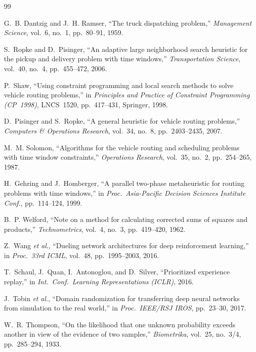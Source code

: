 \documentclass[conference]{IEEEtran}
\begin{document}
\begin{thebibliography}{99}

G.~B. Dantzig and J.~H. Ramser,
``The truck dispatching problem,''
\textit{Management Science}, vol.~6, no.~1, pp.~80--91, 1959.

S.~Ropke and D.~Pisinger,
``An adaptive large neighborhood search heuristic for the pickup and delivery
  problem with time windows,''
\textit{Transportation Science}, vol.~40, no.~4, pp.~455--472, 2006.

P.~Shaw,
``Using constraint programming and local search methods to solve vehicle routing
  problems,''
in \textit{Principles and Practice of Constraint Programming (CP~1998)},
LNCS~1520, pp.~417--431, Springer, 1998.

D.~Pisinger and S.~Ropke,
``A general heuristic for vehicle routing problems,''
\textit{Computers \& Operations Research}, vol.~34, no.~8,
pp.~2403--2435, 2007.

M.~M. Solomon,
``Algorithms for the vehicle routing and scheduling problems with time window
  constraints,''
\textit{Operations Research}, vol.~35, no.~2, pp.~254--265, 1987.

H.~Gehring and J.~Homberger,
``A parallel two-phase metaheuristic for routing problems with time windows,''
in \textit{Proc.\ Asia-Pacific Decision Sciences Institute Conf.},
pp.~114--124, 1999.

B.~P. Welford,
``Note on a method for calculating corrected sums of squares and products,''
\textit{Technometrics}, vol.~4, no.~3, pp.~419--420, 1962.

Z.~Wang \textit{et al.},
``Dueling network architectures for deep reinforcement learning,''
in \textit{Proc.\ 33rd ICML}, vol.~48, pp.~1995--2003, 2016.

T.~Schaul, J.~Quan, I.~Antonoglou, and D.~Silver,
``Prioritized experience replay,''
in \textit{Int.\ Conf.\ Learning Representations (ICLR)}, 2016.

J.~Tobin \textit{et al.},
``Domain randomization for transferring deep neural networks from simulation to
  the real world,''
in \textit{Proc.\ IEEE/RSJ IROS}, pp.~23--30, 2017.

W.~R. Thompson,
``On the likelihood that one unknown probability exceeds another in view of the
  evidence of two samples,''
\textit{Biometrika}, vol.~25, no.~3/4, pp.~285--294, 1933.


\end{thebibliography}
\end{document}
